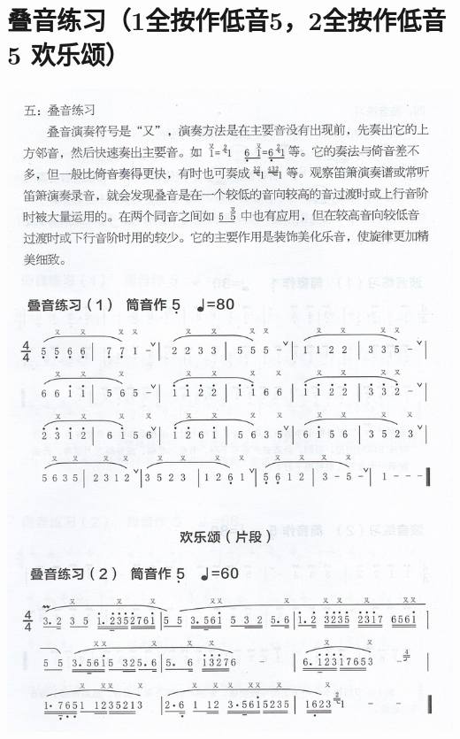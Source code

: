 \documentclass[cn,pad,chinese,chinesefont=nofont]{elegantbook}
\begin{document}
\section{叠音练习（1全按作低音5，2全按作低音5 欢乐颂）}
\includegraphics[height=\textheight]{dongxiao/Scan 11.jpeg}
\end{document}
